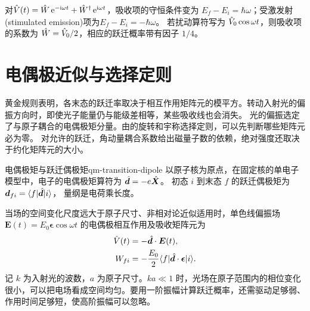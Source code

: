 对$\hat{V}(t) = \hat{W}\mathop{}\!\mathrm{e}^{-\mathrm{i}\omega t} + \hat{W}^\dagger\mathop{}\!\mathrm{e}^{\mathrm{i}\omega t}$，吸收项的守恒条件变为
$E_f - E_i = \hbar\omega$；受激发射(stimulated emission)项为$E_f - E_i = -\hbar\omega$。
若扰动算符写为 $\hat{V}_0\cos\omega t$，则吸收项的系数为 $\hat{W} = \hat{V}_0/2$，相应的跃迁概率带有因子 $1/4$。

\section{电偶极近似与选择定则}
黄金规则表明，各末态的跃迁率取决于相互作用矩阵元的模平方。转动入射光的偏振方向时，即使光子能量仍与能级差相等，某些吸收线也会消失。
光的偏振选定了与原子耦合的电偶极矩分量。由的旋转和宇称选择定则，可以先判断哪些矩阵元必为零。
对允许的跃迁，角动量耦合系数给出磁量子数的依赖，绝对强度还取决于约化矩阵元的大小。

\begin{definition}{电偶极矩与跃迁偶极矩}{qm-transition-dipole}
    以原子核为原点，在固定核的单电子模型中，电子的电偶极矩算符为 $\hat{\bm{d}} = -e\hat{\bm{X}}$。
    初态 $i$ 到末态 $f$ 的跃迁偶极矩为 $\bm d_{fi} = \langle f\vert\hat{\bm{d}}\vert i\rangle$，
    量纲是电荷乘长度。
\end{definition}
当场的空间变化尺度远大于原子尺寸、非相对论近似适用时，单色线偏振场 $\bm E(t) = E_0\bm\epsilon\cos\omega t$ 的电偶极相互作用及吸收矩阵元为
\begin{subequations}
    \begin{align}
        \hat{V}(t) &= -\hat{\bm{d}} \cdot \bm E(t),\\
        W_{fi} &= -\frac{E_0}{2}\langle f\vert\hat{\bm{d}} \cdot \bm\epsilon\vert i\rangle . \label{eq:dipole-absorption-matrix-element}
    \end{align}
\end{subequations}
记 $k$ 为入射光的波数，$a$ 为原子尺寸。$ka \ll 1$ 时，光场在原子范围内的相位变化很小，可以把电场看成空间均匀。要用一阶振幅计算跃迁概率，还需驱动足够弱、作用时间足够短，使高阶振幅可以忽略。

